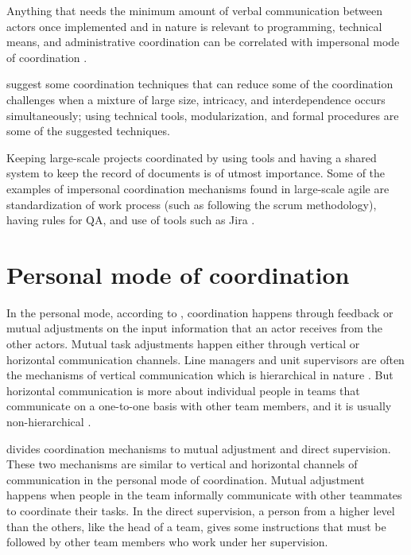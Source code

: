 Anything that needs the minimum amount of verbal communication between actors once implemented and in nature is relevant to programming, technical means, and administrative coordination can be correlated with impersonal mode of coordination \citep{Boos2011,VanDeVen1976}.

\citet{Kraut1995a} suggest some coordination techniques that can reduce some of the coordination challenges when a mixture of large size, intricacy, and interdependence occurs simultaneously;  using technical tools, modularization, and formal procedures are some of the suggested techniques.

Keeping large-scale projects coordinated by using tools and having a shared system to keep the record of documents is of utmost importance. Some of the examples of impersonal coordination mechanisms found in large-scale agile are standardization of work process (such as following the scrum methodology), having rules for QA, and use of tools such as Jira \citep{Nyrud2017b}.

\section{Personal mode of coordination}

In the personal mode, according to \citet{VanDeVen1976}, coordination happens through feedback or mutual adjustments on the input information that an actor receives from the other actors. Mutual task adjustments happen either through vertical or horizontal communication channels.
Line managers and unit supervisors are often the mechanisms of vertical communication which is hierarchical in nature \citep{Thompson2014}. But horizontal communication is more about individual people in teams that communicate on a one-to-one basis with other team members, and it is usually non-hierarchical \citep{VanDeVen1976}.

\citet{Mintzberg1980} divides coordination mechanisms to mutual adjustment and direct supervision. These two mechanisms are similar to vertical and horizontal channels of communication in the personal mode of coordination. Mutual adjustment happens when people in the team informally communicate with other teammates to coordinate their tasks. In the direct supervision, a person from a higher level than the others, like the head of a team, gives some instructions that must be followed by other team members who work under her supervision.


